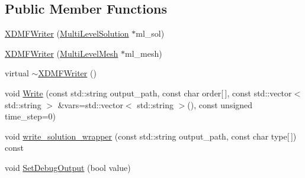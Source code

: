 \subsection*{Public Member Functions}
\begin{DoxyCompactItemize}
\item 
\mbox{\hyperlink{classfemus_1_1_x_d_m_f_writer_aec251ee0511703c8fa147a6688cf2487}{X\+D\+M\+F\+Writer}} (\mbox{\hyperlink{classfemus_1_1_multi_level_solution}{Multi\+Level\+Solution}} $\ast$ml\+\_\+sol)
\item 
\mbox{\hyperlink{classfemus_1_1_x_d_m_f_writer_a09aa7a64477a92db7787f321fa625b53}{X\+D\+M\+F\+Writer}} (\mbox{\hyperlink{classfemus_1_1_multi_level_mesh}{Multi\+Level\+Mesh}} $\ast$ml\+\_\+mesh)
\item 
virtual \mbox{\hyperlink{classfemus_1_1_x_d_m_f_writer_ae9386a697a2fcba2b0d34ff76f3a47f5}{$\sim$\+X\+D\+M\+F\+Writer}} ()
\item 
void \mbox{\hyperlink{classfemus_1_1_x_d_m_f_writer_a01b6d71015768b64cff7adbc98a1ec8f}{Write}} (const std\+::string output\+\_\+path, const char order\mbox{[}$\,$\mbox{]}, const std\+::vector$<$ std\+::string $>$ \&vars=std\+::vector$<$ std\+::string $>$(), const unsigned time\+\_\+step=0)
\item 
void \mbox{\hyperlink{classfemus_1_1_x_d_m_f_writer_a97bf9e676162c81556d94382a8dbb673}{write\+\_\+solution\+\_\+wrapper}} (const std\+::string output\+\_\+path, const char type\mbox{[}$\,$\mbox{]}) const
\item 
void \mbox{\hyperlink{classfemus_1_1_x_d_m_f_writer_a4c69012d7952e8ac011b876a516d073b}{Set\+Debug\+Output}} (bool value)
\end{DoxyCompactItemize}
